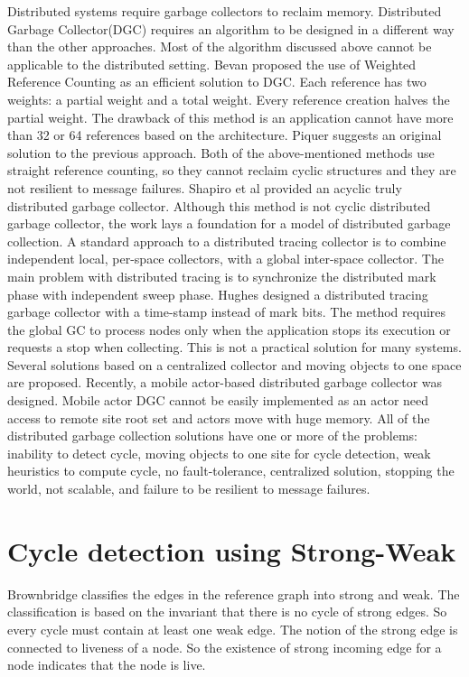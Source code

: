 Distributed systems require garbage collectors to reclaim memory. Distributed Garbage Collector(DGC) requires an algorithm to be designed in a different way than the other approaches. Most of the algorithm discussed above cannot be applicable to the distributed setting. Bevan\cite{Bevan87} proposed the use of Weighted Reference Counting as an efficient solution to DGC. Each reference has two weights: a partial weight and a total weight. Every reference creation halves the partial weight. The drawback of this method is an application cannot have more than 32 or 64 references based on the architecture. Piquer\cite{piquer91} suggests an original solution to the previous approach. Both of the above-mentioned methods use straight reference counting, so they cannot reclaim cyclic structures and they are not resilient to message failures. Shapiro et al \cite{Shapiro92} provided an acyclic truly distributed garbage collector. Although this method is not cyclic distributed garbage collector, the work lays a foundation for a model of distributed garbage collection. A standard approach to a distributed tracing collector is to combine independent local, per-space collectors, with a global inter-space collector. The main problem with distributed tracing is to synchronize the distributed mark phase with independent sweep phase\cite{plain95}. Hughes designed a distributed tracing garbage collector with a time-stamp instead of mark bits\cite{hugh85}. The method requires the global GC to process nodes only when the application stops its execution or requests a stop when collecting. This is not a practical solution for many systems. Several solutions based on a centralized collector and moving objects to one space are proposed\cite{Maheshwari1997,Maheshwari1997b,Liskov,Ladin,Veiga05}. Recently, a mobile actor-based distributed garbage collector was designed\cite{Wang2006}. Mobile actor DGC cannot be easily implemented as an actor need access to remote site root set and actors move with huge memory.  All of the distributed garbage collection solutions have one or more of the problems: inability to detect cycle, moving objects to one site for cycle detection, weak heuristics to compute cycle, no fault-tolerance, centralized solution, stopping the world, not scalable, and failure to be resilient to message failures.


\section{Cycle detection using Strong-Weak}
Brownbridge classifies the edges in the reference graph into strong and weak. The classification is based on the invariant that there is no cycle of strong edges. So every cycle must contain at least one weak edge. The notion of the strong edge is connected to liveness of a node. So  the existence of strong incoming edge for a node indicates that the node is live. 

